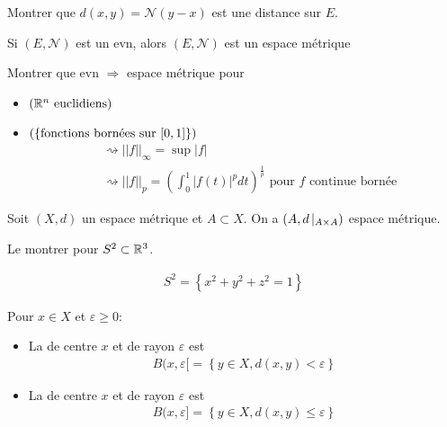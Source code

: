 \documentclass[french,a4paper,10pt]{article}
\begin{document}
	\begin{exercice}
			Montrer que $d(x,y) = \mathcal{N}(y-x)$ est une distance sur $E$.
	\end{exercice}
	
	\begin{remark}
		Si $(E, \mathcal{N})$ est un evn, alors $(E, \mathcal{N})$ est un espace métrique
	\end{remark}
	
	
	\begin{exercice}
		Montrer que evn $\Longrightarrow$ espace métrique pour
		\begin{itemize}
			\item $(\mathbb{R}^n \text{ euclidiens})$
			\item $(\{\text{fonctions bornées sur }\mathopen{[}0,1\mathclose{]}\})$
			\[\begin{aligned}
				&\rightsquigarrow||f||_\infty = \sup|f|\\
				&\rightsquigarrow||f||_p=\left(\int_0^1|f(t)|^pdt\right)^{\frac1p}\text{ pour }f\text{ continue bornée}
			\end{aligned}\]
		\end{itemize}
	\end{exercice} 
	
	
	\begin{example}
		Soit $(X,d)$ un espace métrique et $A\subset X$. On a $(A, d\mathop{}\!|_{A\times A})$ espace métrique.
	\end{example}
	
	\begin{exercice} 
		Le montrer pour $S^2\subset\mathbb{R}^3$.
	\end{exercice}
	\begin{rappel}
		\[\begin{aligned}
			S^2=\left\{x^2+y^2+z^2 = 1\right\}
		\end{aligned}\]
	\end{rappel}
	
	\begin{definition}
		Pour $x\in X$ et $\varepsilon\ge0$:
		\begin{itemize}
			\item La  de centre $x$ et de rayon $\varepsilon$ est
			\[\begin{aligned}
				B(x,\varepsilon\mathopen{}[\mathclose{}=\left\{y\in X, d(x,y)<\varepsilon\right\}
			\end{aligned}\]
			\item La  de centre $x$ et de rayon $\varepsilon$ est
			\[\begin{aligned}
				B(x,\varepsilon\mathopen{}]\mathclose{}=\left\{y\in X, d(x,y)\le\varepsilon\right\}
			\end{aligned}\]
		\end{itemize}
	\end{definition}
	
\end{document}
